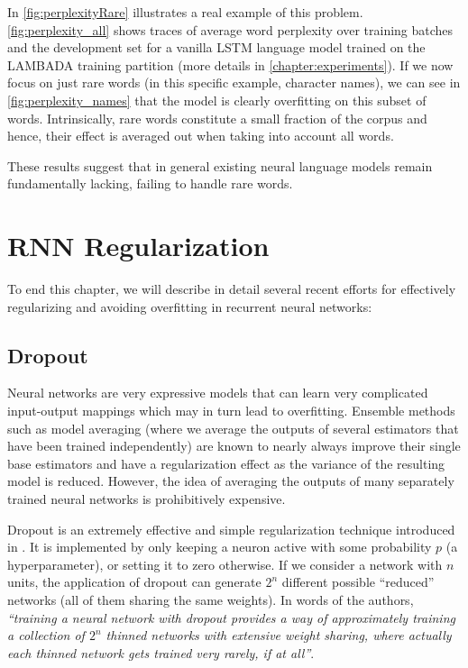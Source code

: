 In \autoref{fig:perplexityRare} illustrates a real example of this problem. \autoref{fig:perplexity_all} shows traces of average word perplexity over training batches and the development set for a vanilla LSTM language model trained on the LAMBADA training partition (more details in \autoref{chapter:experiments}). If we now focus on just rare words (in this specific example, character names), we can see in \autoref{fig:perplexity_names} that the model is clearly overfitting on this subset of words. Intrinsically, rare words constitute a small fraction of the corpus and hence, their effect is averaged out when taking into account all words.

These results suggest that in general existing neural language models remain fundamentally lacking, failing to handle rare words.

\section{RNN Regularization}
\label{sec:rnnRegularization}

To end this chapter, we will describe in detail several recent efforts for effectively regularizing and avoiding overfitting in recurrent neural networks:

\subsection{Dropout}

Neural networks are very expressive models that can learn very complicated input-output mappings which may in turn lead to overfitting. Ensemble methods such as model averaging (where we average the outputs of several estimators that have been trained independently) are known to nearly always improve their single base estimators and have a regularization effect as the variance of the resulting model is reduced. However, the idea of averaging the outputs of many separately trained neural networks is prohibitively expensive. 

Dropout is an extremely effective and simple regularization technique introduced in \cite{srivastava14a}. It is implemented by only keeping a neuron active with some probability $p$ (a hyperparameter), or setting it to zero otherwise. If we consider a network with $n$ units, the application of dropout can generate $2^n$ different possible ``reduced'' networks (all of them sharing the same weights). In words of the authors, \textit{``training a neural network with dropout provides a way of approximately training a collection of $2^n$ thinned networks with extensive weight sharing, where actually each thinned network gets trained very rarely, if at all''}.

